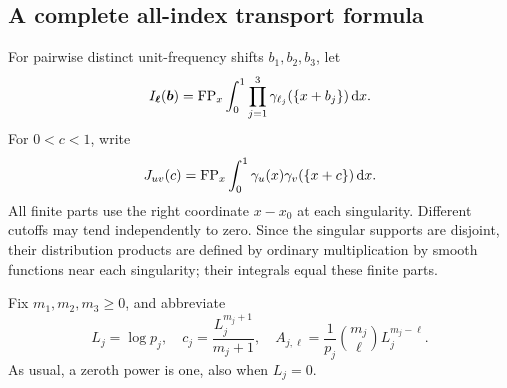 \subsection{A complete all-index transport formula}
For pairwise distinct unit-frequency shifts $b_1,b_2,b_3$, let
\begin{equation}\label{tr:Idef}
 I_{\boldsymbol\ell}(\boldsymbol b)
   =\operatorname{FP}_x\int_0^1\prod_{j=1}^3
              \gamma_{\ell_j}(\{x+b_j\})\,\mathrm d x.
\end{equation}
For $0<c<1$, write
\begin{equation}\label{tr:Jdef}
 J_{uv}(c)=\operatorname{FP}_x\int_0^1
           \gamma_u(x)\gamma_v(\{x+c\})\,\mathrm d x.
\end{equation}
All finite parts use the right coordinate $x-x_0$ at each singularity.
Different cutoffs may tend independently to zero. Since the singular
supports are disjoint, their distribution products are defined by
ordinary multiplication by smooth functions near each singularity;
their integrals equal these finite parts.

Fix $m_1,m_2,m_3\geq0$, and abbreviate
\[
 L_j=\log p_j,\quad c_j=\frac{L_j^{m_j+1}}{m_j+1},\quad
 A_{j,\ell}=\frac1{p_j}\binom{m_j}{\ell}L_j^{m_j-\ell}.
\]
As usual, a zeroth power is one, also when $L_j=0$.

